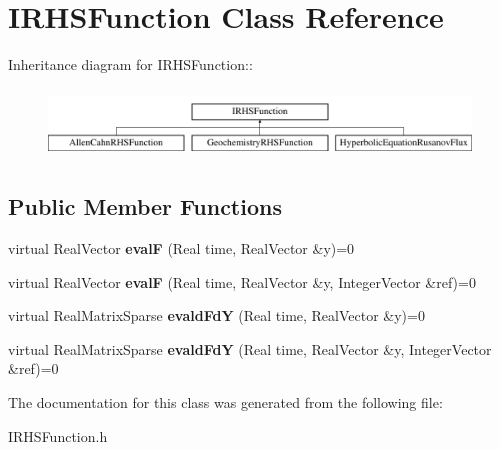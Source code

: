 \hypertarget{classIRHSFunction}{
\section{IRHSFunction Class Reference}
\label{classIRHSFunction}
}
Inheritance diagram for IRHSFunction::\begin{figure}[H]
\begin{center}
\leavevmode
\includegraphics[height=1.83908cm]{classIRHSFunction}
\end{center}
\end{figure}
\subsection*{Public Member Functions}
\begin{DoxyCompactItemize}
\item 
\hypertarget{classIRHSFunction_a0ba33a3b44f77c7f51c3ce085ecbd003}{
virtual RealVector {\bfseries evalF} (Real time, RealVector \&y)=0}
\label{classIRHSFunction_a0ba33a3b44f77c7f51c3ce085ecbd003}

\item 
\hypertarget{classIRHSFunction_a5f28c5fe8ffde86f839e859cd2fb6424}{
virtual RealVector {\bfseries evalF} (Real time, RealVector \&y, IntegerVector \&ref)=0}
\label{classIRHSFunction_a5f28c5fe8ffde86f839e859cd2fb6424}

\item 
\hypertarget{classIRHSFunction_af82bf63b0230781d0936825c97ac15cc}{
virtual RealMatrixSparse {\bfseries evaldFdY} (Real time, RealVector \&y)=0}
\label{classIRHSFunction_af82bf63b0230781d0936825c97ac15cc}

\item 
\hypertarget{classIRHSFunction_a4e4676728e8141f7dc956e061e6468c4}{
virtual RealMatrixSparse {\bfseries evaldFdY} (Real time, RealVector \&y, IntegerVector \&ref)=0}
\label{classIRHSFunction_a4e4676728e8141f7dc956e061e6468c4}

\end{DoxyCompactItemize}


The documentation for this class was generated from the following file:\begin{DoxyCompactItemize}
\item 
IRHSFunction.h\end{DoxyCompactItemize}
